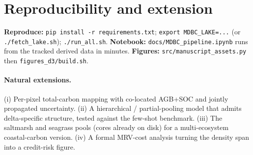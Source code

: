 \documentclass[11pt]{article}
\newcommand{\file}[1]{\texttt{\small #1}}
\begin{document}
\section{Reproducibility and extension}
\textbf{Reproduce:} \file{pip install -r requirements.txt}; \file{export MDBC\_LAKE=...} (or
\file{./fetch\_lake.sh}); \file{./run\_all.sh}. \textbf{Notebook:} \file{docs/MDBC\_pipeline.ipynb}
runs from the tracked derived data in minutes. \textbf{Figures:} \file{src/manuscript\_assets.py}
then \file{figures\_d3/build.sh}.

\paragraph{Natural extensions.} (i) Per-pixel total-carbon mapping with co-located AGB+SOC
and jointly propagated uncertainty. (ii) A hierarchical / partial-pooling model that admits
delta-specific structure, tested against the few-shot benchmark. (iii) The saltmarsh and
seagrass pools (cores already on disk) for a multi-ecosystem coastal-carbon version. (iv) A
formal MRV-cost analysis turning the density span into a credit-risk figure.
\end{document}
